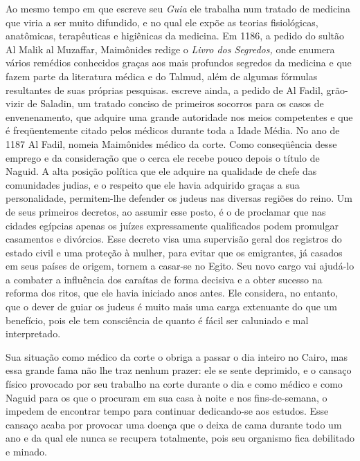 \begin{itemize}
\begin{enumrate}
Ao mesmo tempo em que escreve seu \emph{Guia} ele trabalha num trata­do
de medicina que viria a ser muito difundido, e no qual ele expõe as
teorias fisiológicas, anatômicas, terapêuticas e higiênicas da medicina.
Em 1186, a pe­dido do sultão Al Malik al Muzaffar, Maimônides redige o
\emph{Livro dos Segredos,} onde enumera vários remédios conhecidos
graças aos mais profundos segre­dos da medicina e que fazem parte da
literatura médica e do Talmud, além de algumas fórmulas resultantes de
suas próprias pesquisas. escreve ainda, a pedi­do de Al Fadil,
grão-vizir de Saladin, um tratado conciso de primeiros socorros para os
casos de envenenamento, que adquire uma grande autoridade nos meios
competentes e que é freqüentemente citado pelos médicos durante toda a
Ida­de Média.
No ano de 1187 Al Fadil, nomeia Maimônides médico da corte. Co­mo
conseqüência desse emprego e da consideração que o cerca ele recebe
pouco depois o título de Naguid. A alta posição política que ele adquire
na qualidade de chefe das comunidades judias, e o respeito que ele havia
adquirido graças a sua personalidade, permitem-lhe defender os judeus
nas diversas regiões do reino. Um de seus primeiros decretos, ao assumir
esse posto, é o de proclamar que nas cidades egípcias apenas os juízes
expressamente qualificados podem promulgar casamentos e divórcios. Esse
decreto visa uma supervisão geral dos registros do estado civil e uma
proteção à mulher, para evitar que os emigran­tes, já casados em seus
países de origem, tornem a casar-se no Egito. Seu novo cargo vai
ajudá-lo a combater a influência dos caraítas de forma decisiva e a
obter sucesso na reforma dos ritos, que ele havia iniciado anos antes.
Ele consi­dera, no entanto, que o dever de guiar os judeus é muito mais
uma carga exte­nuante do que um benefício, pois ele tem consciência de
quanto é fácil ser ca­luniado e mal interpretado.

Sua situação como médico da corte o obriga a passar o dia inteiro no
Cairo, mas essa grande fama não lhe traz nenhum prazer: ele se sente
depri­mido, e o cansaço físico provocado por seu trabalho na corte
durante o dia e como médico e como Naguid para os que o procuram em sua
casa à noite e nos fins-de-semana, o impedem de encontrar tempo para
continuar dedican­do-se aos estudos. Esse cansaço acaba por provocar uma
doença que o deixa de cama durante todo um ano e da qual ele nunca se
recupera totalmente, pois seu organismo fica debilitado e minado.


\end{enumrate}
\end{itemize}
